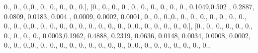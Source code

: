 \documentclass[
]{book}
\newenvironment{Shaded}{\begin{snugshade}}{\end{snugshade}}
\newcommand{\FloatTok}[1]{\textcolor[rgb]{0.00,0.00,0.81}{#1}}
\newcommand{\NormalTok}[1]{#1}
\begin{document}
\begin{Shaded}
\begin{Highlighting}[]
\FloatTok{0.}\NormalTok{, }\FloatTok{0.}\NormalTok{, }\FloatTok{0.}\NormalTok{,}\FloatTok{0.}\NormalTok{, }\FloatTok{0.}\NormalTok{, }\FloatTok{0.}\NormalTok{, }\FloatTok{0.}\NormalTok{, }\FloatTok{0.}\NormalTok{, }\FloatTok{0.}\NormalTok{], [}\FloatTok{0.}\NormalTok{, }\FloatTok{0.}\NormalTok{, }\FloatTok{0.}\NormalTok{, }\FloatTok{0.}\NormalTok{, }\FloatTok{0.}\NormalTok{, }\FloatTok{0.}\NormalTok{, }\FloatTok{0.}\NormalTok{, }\FloatTok{0.}\NormalTok{, }\FloatTok{0.}\NormalTok{, }\FloatTok{0.}\NormalTok{,}
\FloatTok{0.1049}\NormalTok{,}\FloatTok{0.502}\NormalTok{ , }\FloatTok{0.2887}\NormalTok{, }\FloatTok{0.0809}\NormalTok{, }\FloatTok{0.0183}\NormalTok{, }\FloatTok{0.004}\NormalTok{ , }\FloatTok{0.0009}\NormalTok{, }\FloatTok{0.0002}\NormalTok{, }\FloatTok{0.0001}\NormalTok{, }\FloatTok{0.}\NormalTok{, }\FloatTok{0.}\NormalTok{,}
\FloatTok{0.}\NormalTok{,}\FloatTok{0.}\NormalTok{, }\FloatTok{0.}\NormalTok{, }\FloatTok{0.}\NormalTok{, }\FloatTok{0.}\NormalTok{, }\FloatTok{0.}\NormalTok{, }\FloatTok{0.}\NormalTok{, }\FloatTok{0.}\NormalTok{, }\FloatTok{0.}\NormalTok{, }\FloatTok{0.}\NormalTok{, }\FloatTok{0.}\NormalTok{, }\FloatTok{0.}\NormalTok{,}\FloatTok{0.}\NormalTok{, }\FloatTok{0.}\NormalTok{, }\FloatTok{0.}\NormalTok{, }\FloatTok{0.}\NormalTok{, }\FloatTok{0.}\NormalTok{, }\FloatTok{0.}\NormalTok{, }\FloatTok{0.}\NormalTok{, }\FloatTok{0.}\NormalTok{,}
\FloatTok{0.}\NormalTok{, }\FloatTok{0.}\NormalTok{, }\FloatTok{0.}\NormalTok{,}\FloatTok{0.}\NormalTok{, }\FloatTok{0.}\NormalTok{, }\FloatTok{0.}\NormalTok{, }\FloatTok{0.}\NormalTok{, }\FloatTok{0.}\NormalTok{, }\FloatTok{0.}\NormalTok{], [}\FloatTok{0.}\NormalTok{, }\FloatTok{0.}\NormalTok{, }\FloatTok{0.}\NormalTok{, }\FloatTok{0.}\NormalTok{, }\FloatTok{0.}\NormalTok{, }\FloatTok{0.}\NormalTok{, }\FloatTok{0.}\NormalTok{, }\FloatTok{0.}\NormalTok{, }\FloatTok{0.}\NormalTok{, }\FloatTok{0.}\NormalTok{,}
\FloatTok{0.0003}\NormalTok{,}\FloatTok{0.1962}\NormalTok{, }\FloatTok{0.4888}\NormalTok{, }\FloatTok{0.2319}\NormalTok{, }\FloatTok{0.0636}\NormalTok{, }\FloatTok{0.0148}\NormalTok{, }\FloatTok{0.0034}\NormalTok{, }\FloatTok{0.0008}\NormalTok{, }\FloatTok{0.0002}\NormalTok{, }\FloatTok{0.}\NormalTok{, }\FloatTok{0.}\NormalTok{,}
\FloatTok{0.}\NormalTok{,}\FloatTok{0.}\NormalTok{, }\FloatTok{0.}\NormalTok{, }\FloatTok{0.}\NormalTok{, }\FloatTok{0.}\NormalTok{, }\FloatTok{0.}\NormalTok{, }\FloatTok{0.}\NormalTok{, }\FloatTok{0.}\NormalTok{, }\FloatTok{0.}\NormalTok{, }\FloatTok{0.}\NormalTok{, }\FloatTok{0.}\NormalTok{, }\FloatTok{0.}\NormalTok{,}\FloatTok{0.}\NormalTok{, }\FloatTok{0.}\NormalTok{, }\FloatTok{0.}\NormalTok{, }\FloatTok{0.}\NormalTok{, }\FloatTok{0.}\NormalTok{, }\FloatTok{0.}\NormalTok{, }\FloatTok{0.}\NormalTok{, }\FloatTok{0.}\NormalTok{,}

\end{Highlighting}
\end{Shaded}
\end{document}
